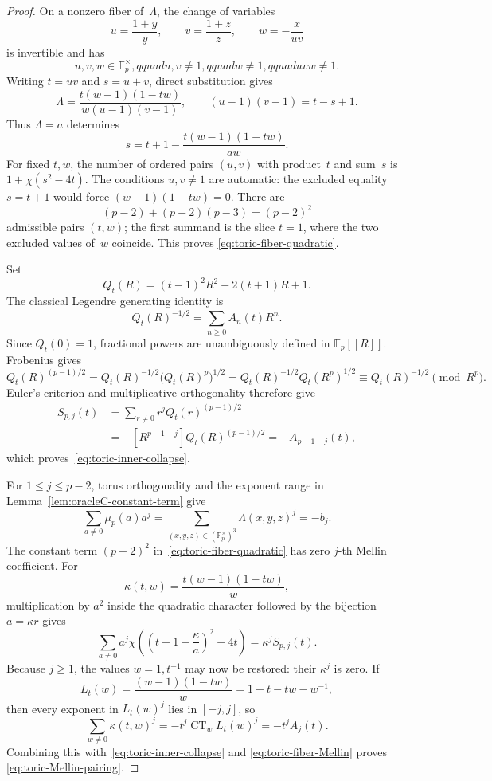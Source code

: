 \begin{proof}
On a nonzero fiber of~$\Lambda$, the change of variables
\[
 u=\frac{1+y}{y},\qquad
 v=\frac{1+z}{z},\qquad
 w=-\frac{x}{uv}
\]
is invertible and has
\[
 u,v,w\in\mathbb F_p^\times,qquad
 u,v\ne1,qquad w\ne1,qquad uvw\ne1.
\]
Writing $t=uv$ and $s=u+v$, direct substitution gives
\[
 \Lambda=\frac{t(w-1)(1-tw)}{w(u-1)(v-1)},
 \qquad
 (u-1)(v-1)=t-s+1.
\]
Thus $\Lambda=a$ determines
\[
 s=t+1-\frac{t(w-1)(1-tw)}{aw}.
\]
For fixed $t,w$, the number of ordered pairs $(u,v)$ with product~$t$
and sum~$s$ is $1+\chi(s^2-4t)$.  The conditions $u,v\ne1$ are automatic:
the excluded equality $s=t+1$ would force $(w-1)(1-tw)=0$.
There are
\[
 (p-2)+(p-2)(p-3)=(p-2)^2
\]
admissible pairs $(t,w)$; the first summand is the slice $t=1$, where the
two excluded values of~$w$ coincide.  This proves
\eqref{eq:toric-fiber-quadratic}.

Set
\[
 Q_t(R)=(t-1)^2R^2-2(t+1)R+1.
\]
The classical Legendre generating identity is
\begin{equation}
 Q_t(R)^{-1/2}=\sum_{n\geq0}A_n(t)R^n.
 \label{eq:toric-Legendre-generating}
\end{equation}
Since $Q_t(0)=1$, fractional powers are unambiguously defined in
$\mathbb F_p[[R]]$.  Frobenius gives
\[
 Q_t(R)^{(p-1)/2}
 =Q_t(R)^{-1/2}\bigl(Q_t(R)^p\bigr)^{1/2}
 =Q_t(R)^{-1/2}Q_t(R^p)^{1/2}
 \equiv Q_t(R)^{-1/2}\pmod{R^p}.
\]
Euler's criterion and multiplicative orthogonality therefore give
\begin{align*}
 S_{p,j}(t)
 &=\sum_{r\ne0}r^jQ_t(r)^{(p-1)/2}\\
 &=-[R^{p-1-j}]Q_t(R)^{(p-1)/2}
  =-A_{p-1-j}(t),
\end{align*}
which proves~\eqref{eq:toric-inner-collapse}.

For $1\leq j\leq p-2$, torus orthogonality and the exponent range in
Lemma~\ref{lem:oracleC-constant-term} give
\begin{equation}
 \sum_{a\ne0}\mu_p(a)a^j
 =\sum_{(x,y,z)\in(\mathbb F_p^\times)^3}\Lambda(x,y,z)^j
 =-b_j.
 \label{eq:toric-fiber-Mellin}
\end{equation}
The constant term $(p-2)^2$ in~\eqref{eq:toric-fiber-quadratic} has zero
$j$-th Mellin coefficient.  For
\[
 \kappa(t,w)=\frac{t(w-1)(1-tw)}w,
\]
multiplication by $a^2$ inside the quadratic character followed by the
bijection $a=\kappa r$ gives
\[
 \sum_{a\ne0}a^j
 \chi\!\left(\left(t+1-\frac\kappa a\right)^2-4t\right)
 =\kappa^jS_{p,j}(t).
\]
Because $j\geq1$, the values $w=1,t^{-1}$ may now be restored: their
$\kappa^j$ is zero.  If
\[
 L_t(w)=\frac{(w-1)(1-tw)}w=1+t-tw-w^{-1},
\]
then every exponent in $L_t(w)^j$ lies in $[-j,j]$, so
\[
 \sum_{w\ne0}\kappa(t,w)^j
 =-t^j\operatorname{CT}_w L_t(w)^j
 =-t^jA_j(t).
\]
Combining this with~\eqref{eq:toric-inner-collapse} and
\eqref{eq:toric-fiber-Mellin} proves
\eqref{eq:toric-Mellin-pairing}.


\end{proof}
